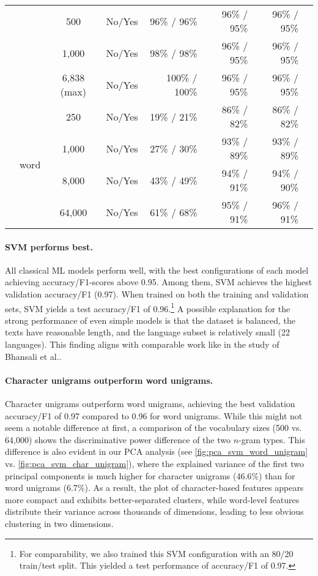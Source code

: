 \begin{table}[htbp]
\begin{tabular}{llccrrrr}
        & & 500 & No/Yes & 96\% / 96\% & 96\% / 95\% & 96\% / 95\% \\ 
        & & 1,000 & No/Yes & 98\% / 98\% & 96\% / 95\% & 96\% / 95\% \\
        & & 6,838 (max) & No/Yes & 100\% / 100\% & 96\% / 95\% & 96\% / 95\% \\
        \cmidrule{2-7}
        & \multirow{4}{*}{word} & 250 & No/Yes & 19\% / 21\% & 86\% / 82\% & 86\% / 82\%  \\
        & & 1,000 & No/Yes & 27\% / 30\% & 93\% / 89\% & 93\% / 89\% \\
        & & 8,000 & No/Yes & 43\% / 49\% & 94\% / 91\% & 94\% / 90\% \\
        & & 64,000 & No/Yes & 61\% / 68\% & 95\% / 91\% & 96\% / 91\%\\
        \bottomrule
        \end{tabular}
\end{table}

\paragraph{SVM performs best.}
All classical ML models perform well, with the best configurations of each model achieving accuracy/F1-scores above 0.95. Among them, SVM achieves the highest validation accuracy/F1 (0.97). When trained on both the training and validation sets, SVM yields a test accuracy/F1 of 0.96.\footnote{For comparability, we also trained this SVM configuration with an 80/20 train/test split. This yielded a test performance of accuracy/F1 of 0.97.} A possible explanation for the strong performance of even simple models is that the dataset is balanced, the texts have reasonable length, and the language subset is relatively small (22 languages). This finding aligns with comparable work like in the study of Bhansali et al.. \cite{Bhansali2022}

\paragraph{Character unigrams outperform word unigrams.}
Character unigrams outperform word unigrams, achieving the best validation accuracy/F1 of 0.97 compared to 0.96 for word unigrams. While this might not seem a notable difference at first, a comparison of the vocabulary sizes (500 vs. 64,000) shows the discriminative power difference of the two $n$-gram types. This difference is also evident in our PCA analysis (see \cref{fig:pca_svm_word_unigram} vs. \cref{fig:pca_svm_char_unigram}), where the explained variance of the first two principal components is much higher for character unigrams (46.6\%) than for word unigrams (6.7\%). As a result, the plot of character-based features appears more compact and exhibits better-separated clusters, while word-level features distribute their variance across thousands of dimensions, leading to less obvious clustering in two dimensions.

